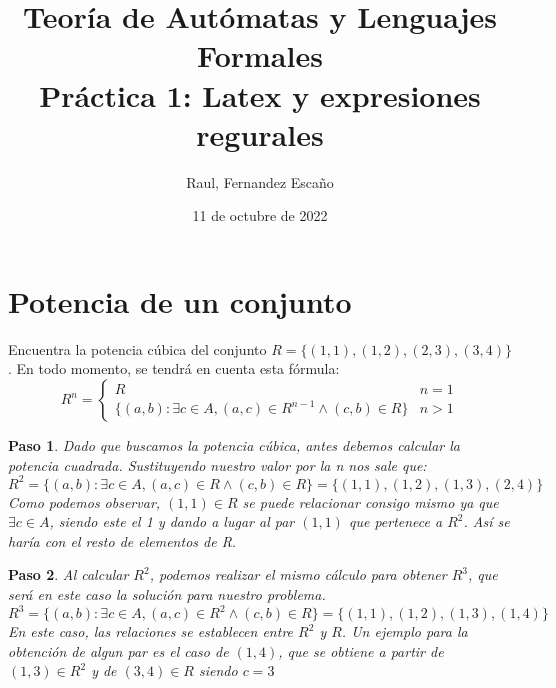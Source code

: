 \documentclass{article}
\title{Teoría de Autómatas y Lenguajes Formales\\[.4\baselineskip]Práctica 1: Latex y expresiones regurales}
\author{Raul, Fernandez Escaño}
\date{11 de octubre de 2022}
\newtheorem{example}{Paso}
\begin{document}

\maketitle

\section{Potencia de un conjunto}
Encuentra la potencia cúbica del conjunto $R=\{(1,1),(1,2),(2,3)
,(3,4)\}$. En todo momento, se tendrá en cuenta esta fórmula:
\begin{equation*}
 R^n = 
 \begin{cases}
 	R & n = 1 \\
 	\{(a,b)\colon \exists c \in A, (a,c)\in R^{n-1} \land
 	(c,b) \in R \} & n > 1
 \end{cases}
\end{equation*}
 \begin{example}
 Dado que buscamos la potencia cúbica, antes debemos calcular la potencia cuadrada. Sustituyendo nuestro valor por la n nos sale que:
  \begin{equation*}
 	R^2 = \{(a,b)\colon \exists c \in A, (a,c)\in R \land 
 	(c,b)\in R \} = \{(1,1),(1,2),(1,3),(2,4)\}
  \end{equation*}
 Como podemos observar, $(1,1)\in R$ se puede relacionar consigo mismo ya que $\exists c \in A$, siendo este el 1 y dando a lugar al par $(1,1)$ que pertenece a $R^2$. Así se haría con el resto de elementos de R.
 \end{example}
 \begin{example}
 Al calcular $R^2$, podemos realizar el mismo cálculo para obtener $R^3$, que será en este caso la solución para nuestro problema.
  \begin{equation*}
 	R^3 = \{(a,b)\colon \exists c\in A, (a,c)\in R^2 \land
 	(c,b) \in R\} = \{(1,1),(1,2),(1,3),(1,4)\}
  \end{equation*}
  En este caso, las relaciones se establecen entre $R^2$ y $R$.
  Un ejemplo para la obtención de algun par es el caso de 
  $(1,4)$, que se obtiene a partir de $(1,3)\in R^2$ y de
  $(3,4)\in R$ siendo $c = 3$
 \end{example}
\end{document}
